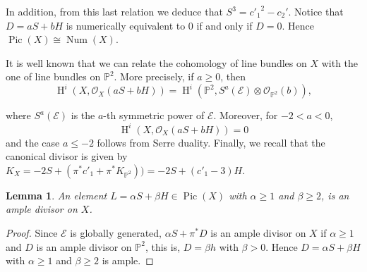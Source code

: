 \documentclass[11pt,twoside]{amsart}
\newtheorem{lemma}[theorem]{Lemma}
\theoremstyle{definition}
\newcommand{\Pic}{\operatorname{Pic}}
\newcommand{\Num}{\operatorname{Num}}
\newcommand{\Ho}{\operatorname{H}}
\begin{document}
In addition, from this last relation we deduce that $S^3={c'_1}^2-c_2'$.  %
Notice that $D=aS+bH$ is numerically equivalent to $0$ if and only if $D=0$. Hence $\Pic(X)\cong \Num(X)$.



It is well known that we can relate the cohomology of line bundles on $X$ with the one of line bundles on $\mathbb{P}^2$. More precisely, if $a\geq0$, then
\begin{equation}
    \label{coh_ruled}
    \Ho^{i}(X,\mathcal{O}_X(aS+b H))=\Ho^{i}(\mathbb{P}^2,S^{a}(\mathcal{E})\otimes \mathcal{O}_{\mathbb{P}^2}(b)),
\end{equation}

\noindent where $S^{a}(\mathcal{E})$ is the $a$-th symmetric power of $\mathcal{E}$.
Moreover, for $-2<a<0$, $$\Ho^{i}(X,\mathcal{O}_X(a S+bH))=0$$ and the case $a\leq -2$ follows from Serre duality. Finally, we recall that the canonical divisor is given by $K_X=-2S+(\pi^*c'_1+\pi^*K_{\mathbb{P}^2}))=-2S+(c'_1-3)H$.


\begin{lemma}
  An element $L=\alpha S+\beta H\in\Pic(X)$ with $\alpha\geq1$ and $\beta\geq2$, is an ample divisor on $X$. 
\end{lemma}
\begin{proof}
    Since $\mathcal{E}$ is globally generated, $\alpha S+\pi^*D$ is an ample divisor on $X$ if $\alpha\geq1$ and $D$ is an ample divisor on $\mathbb{P}^2$, this is, $D=\beta h$ with $\beta >0$. Hence $D= \alpha S+\beta H$ with $\alpha \geq1$ and $\beta\geq2$ is ample.
\end{proof}






\end{document}
